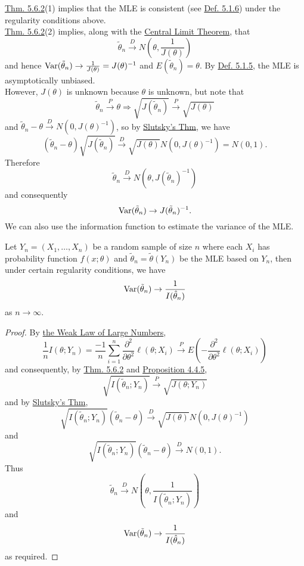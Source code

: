 \documentclass[11pt,fleqn]{book} %
\begin{document}
\begin{remark} \label{rmk:564}
\hyperref[thm:562]{Thm. 5.6.2}(1) implies that the MLE is consistent (see \hyperref[def:516]{Def. 5.1.6}) under the regularity conditions above. \\
\hyperref[thm:562]{Thm. 5.6.2}(2) implies, along with the \hyperref[thm:443]{Central Limit Theorem}, that
\[
\tilde{\theta}_n \xrightarrow{D} N\left(\theta, \frac1{J(\theta)}\right)
\]
and hence \(\operatorname{Var}(\tilde{\theta}_n) \rightarrow \frac{1}{J(\theta)} = J(\theta)^{-1}\) and \(E(\tilde{\theta}_n) = \theta\). By \hyperref[def:515]{Def. 5.1.5}, the MLE is asymptotically unbiased. \\
\indent However, \(J(\theta)\) is unknown because \(\theta\) is unknown, but note that
\[
\tilde{\theta}_n \xrightarrow{P} \theta \Rightarrow \sqrt{J(\tilde{\theta}_n)} \xrightarrow{P} \sqrt{J(\theta)}
\]
and \(\tilde{\theta}_n - \theta \xrightarrow{D} N(0, J(\theta)^{-1})\), so by \hyperref[thm:447]{Slutsky's Thm}, we have
\[
(\tilde{\theta}_n - \theta)\sqrt{J(\tilde{\theta}_n)} \xrightarrow{D} \sqrt{J(\theta)} N(0, J(\theta)^{-1}) = N(0, 1).
\]
\indent Therefore
\[
\tilde{\theta}_n \xrightarrow{D} N(\theta, J(\tilde{\theta}_n)^{-1})
\]
and consequently
\[
\operatorname{Var}(\tilde{\theta}_n) \rightarrow J(\tilde{\theta}_n)^{-1}.
\]
\indent We can also use the information function to estimate the variance of the MLE.
\end{remark}

\begin{proposition} \label{prop:565}
Let \(Y_n = (X_1, \ldots, X_n)\) be a random sample of size \(n\) where each \(X_i\) has probability function \(f(x; \theta)\) and \(\tilde{\theta}_n = \tilde{\theta}(Y_n)\) be the MLE based on \(Y_n\), then under certain regularity conditions, we have
\[
\operatorname{Var}(\tilde{\theta}_n) \rightarrow \frac{1}{I(\hat{\theta}_n)}
\]
as \(n\rightarrow\infty\).
\end{proposition}
\begin{proof}
By \hyperref[thm:431]{the Weak Law of Large Numbers},
\[
\frac1n I(\theta; Y_n) = \frac{-1}{n}\sum_{i=1}^n \frac{\partial^2}{\partial \theta^2}\ell(\theta; X_i) \xrightarrow{P} E\left(-\frac{\partial^2}{\partial \theta^2}\ell(\theta; X_i)\right)
\]
and consequently, by \hyperref[thm:562]{Thm. 5.6.2} and \hyperref[prop:445]{Proposition 4.4.5}, 
\[
\sqrt{I(\tilde{\theta}_n; Y_n)} \xrightarrow{P} \sqrt{J(\theta; Y_n)}
\]
and by \hyperref[thm:447]{Slutsky's Thm}, 
\[
\sqrt{I(\tilde{\theta}_n; Y_n)}(\tilde{\theta}_n - \theta) \xrightarrow{D} \sqrt{J(\theta)}N(0, J(\theta)^{-1})
\]
and
\[
\sqrt{I(\tilde{\theta}_n; Y_n)}(\tilde{\theta}_n - \theta) \xrightarrow{D} N(0, 1).
\]
\indent Thus
\[
\tilde{\theta}_n \xrightarrow{D} N\left(\theta, \frac{1}{I(\tilde{\theta}_n; Y_n)}\right)
\]
and
\[
\operatorname{Var}(\tilde{\theta}_n) \rightarrow \frac{1}{I(\hat{\theta}_n)}
\]
as required.
\end{proof}
\end{document}
